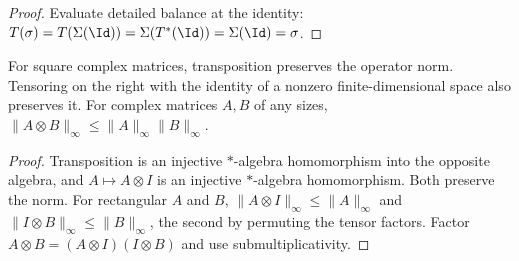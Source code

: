 \begin{proof}
    \leanok
    Evaluate detailed balance at the identity:
    $T(\sigma)=T(\Sigma(\Id))=\Sigma(T^*(\Id))=\Sigma(\Id)=\sigma$.
\end{proof}

\begin{theorem}
    \label{thm:detailed_balance_tensor_norm}
    \leanok
    For square complex matrices, transposition preserves the operator norm.
    Tensoring on the right with the identity of a nonzero finite-dimensional
    space also preserves it. For complex matrices $A,B$ of any sizes,
    $\lVert A\otimes B\rVert_\infty\le\lVert A\rVert_\infty\lVert B\rVert_\infty$.
\end{theorem}
\begin{proof}
    \leanok
    Transposition is an injective $*$-algebra homomorphism into the opposite
    algebra, and $A\mapsto A\otimes I$ is an injective $*$-algebra
    homomorphism. Both preserve the norm. For rectangular $A$ and $B$,
    $\lVert A\otimes I\rVert_\infty\le\lVert A\rVert_\infty$ and
    $\lVert I\otimes B\rVert_\infty\le\lVert B\rVert_\infty$, the second
    by permuting the tensor factors. Factor
    $A\otimes B=(A\otimes I)(I\otimes B)$ and use submultiplicativity.
\end{proof}

